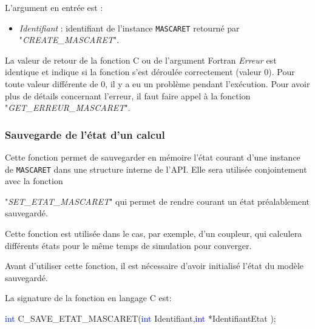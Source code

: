 \documentclass[a4paper,11pt]{article}
\begin{document}
 L'argument en entr\'ee est :
 \vspace{0.5cm}
 \begin{itemize}
    \item \textit{Identifiant} : identifiant de l'instance \texttt{MASCARET} retourn\'e par "\textit{CREATE\_MASCARET}".
 \end{itemize}

 \vspace{0.5cm}
 
 La valeur de retour de la fonction C ou de l'argument Fortran \textit{Erreur} est identique et indique si la fonction s'est d\'eroul\'ee correctement (valeur 0). Pour toute valeur diff\'erente de 0, il y a eu un probl\`eme pendant l'ex\'ecution. Pour avoir plus de d\'etails concernant l'erreur, il faut faire appel \`a la fonction "\textit{GET\_ERREUR\_MASCARET}".

\subsubsection{Sauvegarde de l'\'etat d'un calcul}

 Cette fonction permet de sauvegarder en m\'emoire l'\'etat courant d'une instance de \texttt{MASCARET} dans une structure interne de l'API.
 Elle sera utilis\'ee conjointement avec la fonction 
 
 "\textit{SET\_ETAT\_MASCARET}" qui permet de rendre courant un \'etat pr\'ealablement sauvegard\'e.
 
 \vspace{0.5cm}
 
 Cette fonction est utilis\'ee dans le cas, par exemple, d'un coupleur, qui calculera diff\'erents \'etats pour le m\^eme temps de simulation pour converger.
 
 \vspace{0.5cm}
 
 Avant d'utiliser cette fonction, il est n\'ecessaire d'avoir initialis\'e l'\'etat du mod\`ele sauvegard\'e.
 
 \vspace{0.5cm}
 
 La signature de la fonction en langage C est:
 
 \vspace{0.5cm}
 
 \textcolor{blue}{int} C\_SAVE\_ETAT\_MASCARET(\textcolor{blue}{int} Identifiant,\textcolor{blue}{int} *IdentifiantEtat );
 
 \vspace{0.5cm} 
 
\end{document}
